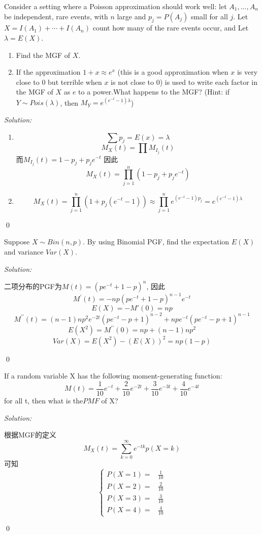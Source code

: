 \documentclass[12pt]{article}
\newenvironment{problem}[2][Problem]{\begin{trivlist}
\item[\hskip \labelsep {\bfseries #1}\hskip \labelsep {\bfseries #2.}]}{\end{trivlist}}
\newenvironment{sol}
    {\emph{Solution:}
    }
    {
    \qed
    }
\newcommand\of[1]{\left( #1 \right)}                                  %
\newcommand{\f}[2]{\frac{#1}{#2}}                                      %
\renewcommand\l{\lambda}                                               %
\newcommand{\x}{=&\!\!\!\!\!}                                                    %
\newcommand{\hua}[2][rl]{\left\{\begin{array}{#1}                              %
        #2
    \end{array}\right.}
\begin{document}
\begin{problem}{4}
Consider a setting where a Poisson approximation should work well: let $A_1,...,A_n$ be independent, rare events, with $n$ large and $p_j=P(A_j)$ small for all $j$. Let $X=I(A_1)+\cdots+I(A_n)$ count how many of the rare events occur, and Let $\lambda = E(X)$.
\begin{enumerate}
    \item[(a).] Find the MGF of $X$.
    \item[(b).] If the approximation $1+x\approx e^x$ (this is a good approximation when $x$ is very close to $0$ but terrible when $x$ is not close to $0$) is used to write each factor in the MGF of $X$ as $e$ to a power.What happens to the MGF? 
    (Hint: if $Y\sim Pois(\lambda)$, then $M_Y=e^{(e^{-t}-1)\lambda}$)
\end{enumerate}
\end{problem}
\begin{sol}
\begin{enumerate}
    \item[(a).] 
$$\sum p_j =E(x) =\l$$
$$M_X(t) = \prod M_{I_j}(t)$$
而$M_{I_j}(t) = 1-p_j+p_je^{-t}$
因此
$$M_X(t) = \prod_{j=1}^n \of{1-p_j+p_je^{-t}}$$

    \item[(b).] 
    $$M_X(t) = \prod_{j=1}^n \of{1+p_j(e^{-t}-1)} \approx \prod_{j=1}^n e^{(e^{-t}-1)p_j} = e^{(e^{-t}-1)\l}$$
    
\end{enumerate}
\end{sol}



\begin{problem}{5}
Suppose $X\sim Bin(n,p)$.
By using Binomial PGF, find the expectation $E(X)$ and variance $Var(X)$.
\end{problem}
\begin{sol}
二项分布的PGF为$M(t)=\left(p e^{-t}+1-p\right)^{n}$, 因此
$$ 
M^{\prime}(t)=-n p\left(p e^{-t}+1-p\right)^{n-1} e^{-t}
 $$
$$E(X)= -M'(0)  = np$$
$$ 
M^{\prime \prime}(t)=(n-1) n p^2 e^{-2 t} \left(p e^{-t}-p+1\right)^{n-2}+n p e^{-t} \left(p e^{-t}-p+1\right)^{n-1}
 $$
 $$ 
E (X^{2})=M^{\prime \prime}(0)=n p + (n-1) n p^2
 $$
 $$ 
Var(X)=E (X^{2})-(E (X))^{2}=n p(1-p)
 $$
\end{sol}




\begin{problem}{6}
If a random variable X has the following moment-generating function:
$$M(t) = \frac{1}{10}e^{-t} + \frac{2}{10}e^{-2t} + \frac{3}{10}e^{-3t} + \frac{4}{10}e^{-4t}$$
for all t, then what is the$ PMF$ of X?
\end{problem}
\begin{sol}
根据MGF的定义$$ 
M_{X}(t)=\sum_{k=0}^{\infty} e^{-t k} p(X=k)
 $$
可知
$$\hua{
    P(X=1) \x \f{1}{10}\\
    P(X=2) \x \f{2}{10}\\
    P(X=3) \x \f{3}{10}\\
    P(X=4) \x \f{4}{10}
}$$
\end{sol}
\end{document}
